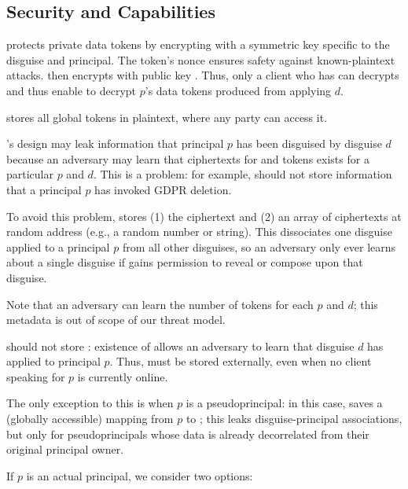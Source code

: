 \subsection{Security and Capabilities}
\sys protects private data tokens  by encrypting  with a symmetric key 
specific to the disguise and principal. The token's nonce ensures safety against known-plaintext
attacks. \sys then encrypts  with public key .  
%
Thus, only a client who has  can decrypts  and thus enable \sys
to decrypt $p$'s data tokens produced from applying $d$.

\sys stores all global  tokens in plaintext, where any party can access it.

\sys's design may leak information that principal $p$ has been disguised by disguise
$d$ because an adversary may learn that ciphertexts for  and  tokens exists for a particular $p$ and $d$.
This is a problem: for example, \sys should not store information that a principal $p$ has
invoked GDPR deletion.

To avoid this problem, \sys stores (1) the  ciphertext and (2) an array of 
ciphertexts at random address  (e.g., a random number or string).
This dissociates one disguise applied to a principal $p$ from all other disguises, so an adversary only ever
learns about a single disguise if \sys gains permission to reveal or compose upon that disguise.

Note that an adversary can learn the number of  tokens for each $p$ and $d$; this
metadata is out of scope of our threat model.

\sys should not store : existence of  allows an adversary to
learn that disguise $d$ has applied to principal $p$. Thus,  must be stored externally,
even when no client speaking for $p$ is currently online.

The only exception to this is when $p$ is a pseudoprincipal: in this case, \sys saves a (globally
accessible) mapping from $p$ to ; this leaks disguise-principal associations, but only for pseudoprincipals whose data is already decorrelated from their original principal owner.

If $p$ is an actual principal, we consider two options: 

